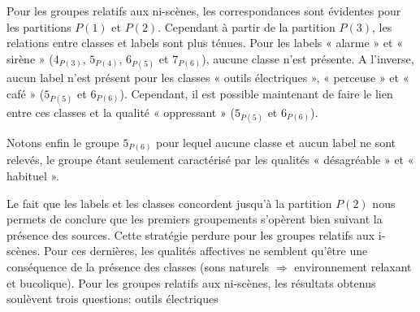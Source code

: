 Pour les groupes relatifs aux ni-scènes, les correspondances sont évidentes pour les partitions $P(1)$ et $P(2)$. Cependant à partir de la partition $P(3)$, les relations entre classes et labels sont plus ténues. Pour les labels « alarme » et « sirène » ($4_{P(3)}$, $5_{P(4)}$, $6_{P(5)}$ et $7_{P(6)}$), aucune classe n'est présente. A l'inverse, aucun label n'est présent pour les classes « outils électriques », « perceuse » et  « café » ($5_{P(5)}$ et $6_{P(6)}$). Cependant, il est possible maintenant de faire le lien entre ces classes et la qualité « oppressant » ($5_{P(5)}$ et $6_{P(6)}$).

Notons enfin le groupe $5_{P(6)}$ pour lequel aucune classe et aucun label ne sont relevés, le groupe étant seulement caractérisé par les qualités « désagréable » et « habituel ».

Le fait que les labels et les classes concordent jusqu'à la partition $P(2)$ nous permets de conclure que les premiers groupements s'opèrent bien suivant la présence des sources. Cette stratégie perdure pour les groupes relatifs aux i-scènes. Pour ces dernières, les qualités affectives ne semblent qu'être une conséquence de la présence des classes (sons naturels $\Rightarrow$ environnement relaxant et bucolique). Pour les groupes relatifs aux ni-scènes, les résultats obtenus soulèvent trois questions:
outils électriques
